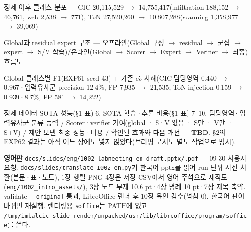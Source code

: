 \par\noindent \textbullet\enspace 정제 이후 클래스 분포 — CIC 20,115,529 \ensuremath{\rightarrow} 14,755,417(infiltration 188,152 \ensuremath{\rightarrow} 46,761, web 2,538 \ensuremath{\rightarrow} 771), ToN 27,520,260 \ensuremath{\rightarrow} 10,807,288(scanning 1,358,977 \ensuremath{\rightarrow} 39,069)


\par\noindent \textbullet\enspace Global과 residual expert 구조 — 오프라인(Global 구성 \ensuremath{\rightarrow} residual \ensuremath{\rightarrow} 군집 \ensuremath{\rightarrow} expert \ensuremath{\rightarrow} S/\allowbreak{}V 학습)/\allowbreak{}온라인(Global \ensuremath{\rightarrow} Scorer \ensuremath{\rightarrow} Expert \ensuremath{\rightarrow} Verifier \ensuremath{\rightarrow} 최종) 흐름도


\par\noindent \textbullet\enspace Global 클래스별 F1(EXP61 seed 43) +\allowbreak{} 기존 e3 사례(CIC 담당영역 0.440 \ensuremath{\rightarrow} 0.967·입력유사군 precision 12.4\%, FP 7,935 \ensuremath{\rightarrow} 21,535; ToN injection 0.159 \ensuremath{\rightarrow} 0.939·8.7\%, FP 581 \ensuremath{\rightarrow} 14,222)


\par\noindent \textbullet\enspace 정제 데이터 SOTA 성능(§1 표) 6. SOTA 학습·추론 비용(§1 표) 7–10. 담당영역·입력유사군 분류 능력 /\allowbreak{} Scorer·verifier 기여(global · S·V 없음 · S만 · V만 · S+\allowbreak{}V) /\allowbreak{} 제안 모델 최종 성능·비용 /\allowbreak{} 확인된 효과와 다음 개선 — \textbf{TBD}. §2의 EXP62 결과는 아직 어느 장에도 넣지 않았다(브리핑 문서도 별도 작업으로 명시).



\par\noindent \textbullet\enspace \textbf{영어판} \texttt{docs/\allowbreak{}\allowbreak{}sli\allowbreak{}des/\allowbreak{}\allowbreak{}eng/\allowbreak{}\allowbreak{}1002\_\allowbreak{}\allowbreak{}lab\allowbreak{}meeting\_\allowbreak{}\allowbreak{}en\_\allowbreak{}\allowbreak{}draft\allowbreak{}.\allowbreak{}pptx/\allowbreak{}\allowbreak{}.\allowbreak{}p\allowbreak{}df} — 09-30 사용자 요청. \texttt{docs/\allowbreak{}\allowbreak{}sli\allowbreak{}des/\allowbreak{}\allowbreak{}tran\allowbreak{}slate\_\allowbreak{}\allowbreak{}10\allowbreak{}02\_\allowbreak{}\allowbreak{}en.\allowbreak{}py\allowbreak{}}가 한국어 pptx를 읽어 run 단위 사전 치환(본문·표·노트), 1장 행렬 PNG 4장은 저장 CSV에서 영어 주석으로 재작도(\texttt{eng/\allowbreak{}\allowbreak{}1002\allowbreak{}\_\allowbreak{}\allowbreak{}intro\_\allowbreak{}\allowbreak{}a\allowbreak{}ssets/\allowbreak{}\allowbreak{}}), 3장 노드 부제 10.6 pt·4장 범례 10 pt·7장 제목 축약. validate \texttt{-\allowbreak{}-\allowbreak{}origin\allowbreak{}al} 통과, LibreOffice 렌더 후 10장 육안 검수(넘침 0). 한국어 판이 바뀌면 재실행. 렌더링용 \texttt{soffice}는 PATH에 없고 \texttt{/\allowbreak{}\allowbreak{}tmp/\allowbreak{}\allowbreak{}imb\allowbreak{}alcic\_\allowbreak{}\allowbreak{}sl\allowbreak{}ide\_\allowbreak{}\allowbreak{}rend\allowbreak{}er/\allowbreak{}\allowbreak{}unpac\allowbreak{}ked/\allowbreak{}\allowbreak{}usr/\allowbreak{}\allowbreak{}lib/\allowbreak{}\allowbreak{}libr\allowbreak{}eoffice/\allowbreak{}\allowbreak{}program/\allowbreak{}\allowbreak{}soffice}를 쓴다.


